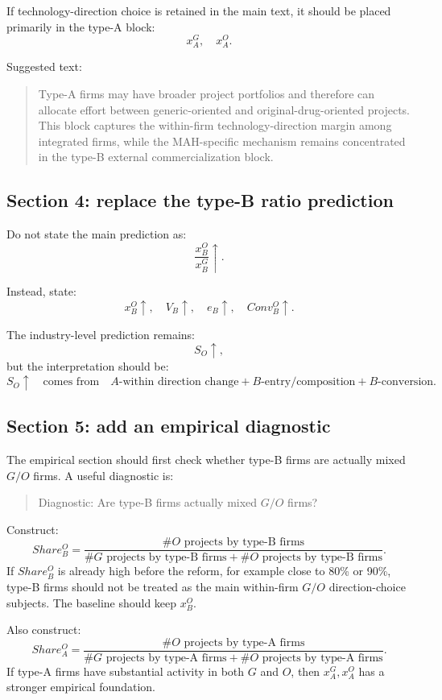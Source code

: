 \documentclass[12pt]{article}
\begin{document}
If technology-direction choice is retained in the main text, it should be placed primarily in the type-A block:
\[
x_A^G,\quad x_A^O.
\]

Suggested text:
\begin{quote}
Type-A firms may have broader project portfolios and therefore can allocate effort between generic-oriented and original-drug-oriented projects. This block captures the within-firm technology-direction margin among integrated firms, while the MAH-specific mechanism remains concentrated in the type-B external commercialization block.
\end{quote}

\subsection{Section 4: replace the type-B ratio prediction}

Do not state the main prediction as:
\[
\frac{x_B^O}{x_B^G}\uparrow.
\]

Instead, state:
\[
x_B^O\uparrow,
\quad
V_B\uparrow,
\quad
e_B\uparrow,
\quad
Conv_B^O\uparrow.
\]

The industry-level prediction remains:
\[
S_O\uparrow,
\]
but the interpretation should be:
\[
S_O\uparrow
\quad \text{comes from} \quad
A\text{-within direction change}
+
B\text{-entry/composition}
+
B\text{-conversion}.
\]

\subsection{Section 5: add an empirical diagnostic}

The empirical section should first check whether type-B firms are actually mixed $G/O$ firms. A useful diagnostic is:
\begin{quote}
Diagnostic: Are type-B firms actually mixed $G/O$ firms?
\end{quote}

Construct:
\[
Share_B^O
=
\frac{\# O\text{ projects by type-B firms}}
{\# G\text{ projects by type-B firms}+\# O\text{ projects by type-B firms}}.
\]
If $Share_B^O$ is already high before the reform, for example close to 80\% or 90\%, type-B firms should not be treated as the main within-firm $G/O$ direction-choice subjects. The baseline should keep $x_B^O$.

Also construct:
\[
Share_A^O
=
\frac{\# O\text{ projects by type-A firms}}
{\# G\text{ projects by type-A firms}+\# O\text{ projects by type-A firms}}.
\]
If type-A firms have substantial activity in both $G$ and $O$, then $x_A^G,x_A^O$ has a stronger empirical foundation.
\end{document}
